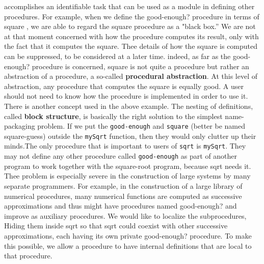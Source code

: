 \documentclass[a4paper,twoside]{article}
\numberwithin{equation}{section}
\begin{document}
accomplishes an identifiable task that can be used as a module in defining other procedures.
For example, when we define the good-enough? procedure in terms of square , we are able to regard
the square procedure as a "black box.” We are not at that moment concerned with how the procedure
computes its result, only with the fact that it computes the square. Thee details of how the square is
computed can be suppressed,
to be considered at a later time. indeed, as far as the good-enough? procedure is concerned,
square is not quite a procedure but rather an abstraction of a procedure, a so-called
\textbf{procedural abstraction}. At this level of abstraction, any procedure that computes the square
is equally good.
A user should not need to know how the procedure is implemented in order to use it. \newline
There is another concept used in the above example. The nesting of definitions, called
\textbf{block structure}, is basically the right solution to the simplest name-packaging problem.
If we put the \texttt{good-enough} and \texttt{square} (better be named square-guess) outside the
\texttt{mySqrt} function, then they would only clutter up their minds.The only procedure that is
important to users of \texttt{sqrt} is \texttt{mySqrt}. They may not define any other procedure
called \texttt{good-enough} as part of another program to work together with the square-root program,
because sqrt needs it. Thee problem is especially severe in the construction of large systems by many
separate programmers. For example, in the construction of a large library of numerical procedures,
many numerical functions are computed as successive approximations and thus might have procedures
named good-enough? and improve as auxiliary procedures. We would like to localize the subprocedures,
Hiding them inside sqrt so that sqrt could coexist with other successive approximations, each having
its own private good-enough? procedure. To make this possible, we allow a procedure to have internal
definitions that are local to that procedure.
\end{document}
